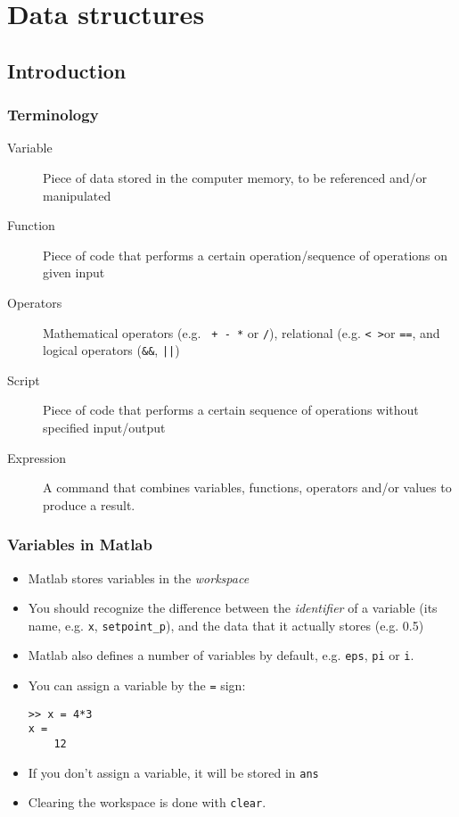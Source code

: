 \section{Data structures}
\subsection*{Introduction}
\begin{frame}
 \frametitle{Terminology}
 \begin{description}
  \item[Variable] Piece of data stored in the computer memory, to be referenced and/or manipulated
  \item[Function] Piece of code that performs a certain operation/sequence of operations on given input
  \item[Operators] Mathematical operators (e.g. \lstinline$ + - *$ or \lstinline$/$), relational (e.g. \lstinline$< >$or \lstinline$==$, and logical operators (\lstinline$&&$, \lstinline$||$)
  \item[Script] Piece of code that performs a certain sequence of operations without specified input/output
  \item[Expression] A command that combines variables, functions, operators and/or values to produce a result.
 \end{description}
\end{frame}

\begin{frame}[fragile]
 \frametitle{Variables in Matlab}
  \begin{itemize}
   \item Matlab stores variables in the \emph{workspace}\pause
   \item You should recognize the difference between the \emph{identifier} of a variable (its name, e.g. \lstinline$x$, \lstinline$setpoint_p$), and the data that it actually stores (e.g. 0.5)\pause
   \item Matlab also defines a number of variables by default, e.g. \lstinline$eps$, \lstinline$pi$ or \lstinline$i$.\pause
   \item You can assign a variable by the \lstinline$=$ sign:
   \begin{lstlisting}
>> x = 4*3
x =
    12
   \end{lstlisting}\pause
   \item If you don't assign a variable, it will be stored in \lstinline$ans$
   \item Clearing the workspace is done with \lstinline$clear$.
 \end{itemize}
\end{frame}


